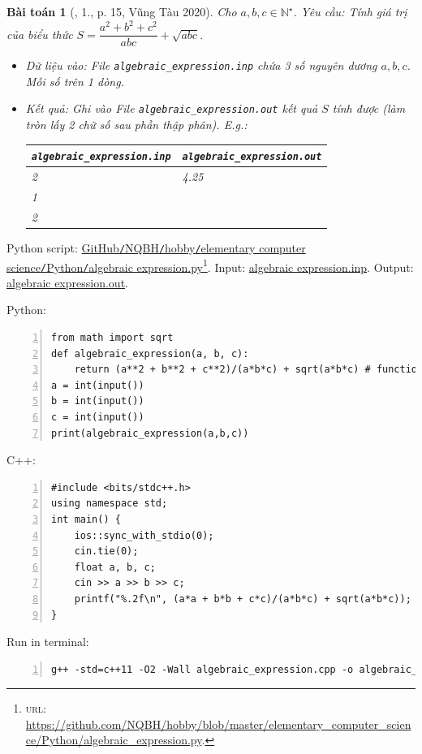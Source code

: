 \documentclass{article}
\newtheorem{baitoan}{Bài toán}
\begin{document}
\begin{baitoan}[\cite{VietSTEM2021}, 1., p. 15, Vũng Tàu 2020]
	Cho $a,b,c\in\mathbb{N}^\star$. {\sf Yêu cầu:} Tính giá trị của biểu thức $S = \dfrac{a^2 + b^2 + c^2}{abc} + \sqrt{abc}$.
	\begin{itemize}
		\item {\sf Dữ liệu vào:} File \verb|algebraic_expression.inp| chứa 3 số nguyên dương $a,b,c$. Mỗi số trên 1 dòng.
		\item {\sf Kết quả:} Ghi vào File \verb|algebraic_expression.out| kết quả $S$ tính được (làm tròn lấy 2 chữ số sau phần thập phân). E.g.:
		\begin{table}[H]
			\centering
			\begin{tabular}{|l|l|}
				\hline
				\verb|algebraic_expression.inp| & \verb|algebraic_expression.out| \\
				\hline
				2 & 4.25 \\
				1 &  \\
				2 &  \\
				\hline
			\end{tabular}
		\end{table}
	\end{itemize}
\end{baitoan}
Python script: \href{https://github.com/NQBH/hobby/blob/master/elementary_computer_science/Python/algebraic_expression.py}{GitHub{\tt /}NQBH{\tt /}hobby{\tt /}elementary computer science{\tt /}Python{\tt /}algebraic expression.py}\footnote{\textsc{url}: \url{https://github.com/NQBH/hobby/blob/master/elementary_computer_science/Python/algebraic_expression.py}.}. Input: \href{https://github.com/NQBH/hobby/blob/master/elementary_computer_science/Python/algebraic_expression.inp}{algebraic expression.inp}. Output: \href{https://github.com/NQBH/hobby/blob/master/elementary_computer_science/Python/algebraic_expression.out}{algebraic expression.out}.

Python:
\begin{Verbatim}[numbers=left,xleftmargin=5mm]
from math import sqrt
def algebraic_expression(a, b, c):
    return (a**2 + b**2 + c**2)/(a*b*c) + sqrt(a*b*c) # function f(a,b,c) can be modified
a = int(input())
b = int(input())
c = int(input())
print(algebraic_expression(a,b,c))
\end{Verbatim}
C++:
\begin{Verbatim}[numbers=left,xleftmargin=5mm]
#include <bits/stdc++.h>
using namespace std;
int main() {
    ios::sync_with_stdio(0);
    cin.tie(0);
    float a, b, c;
    cin >> a >> b >> c;
    printf("%.2f\n", (a*a + b*b + c*c)/(a*b*c) + sqrt(a*b*c));
}
\end{Verbatim}
Run in terminal:
\begin{Verbatim}[numbers=left,xleftmargin=5mm]
g++ -std=c++11 -O2 -Wall algebraic_expression.cpp -o algebraic_expression
\end{Verbatim}
\end{document}
